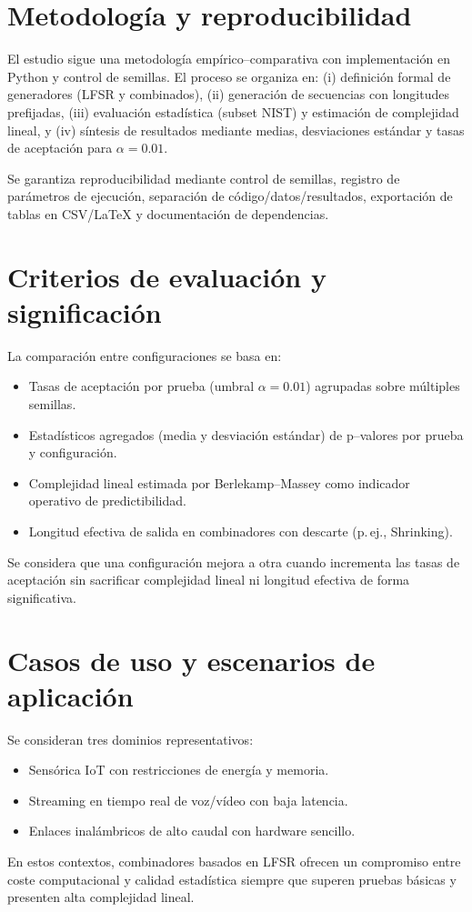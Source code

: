 \section*{Metodología y reproducibilidad}

El estudio sigue una metodología empírico–comparativa con implementación en Python y control de semillas. El proceso se organiza en: (i) definición formal de generadores (LFSR y combinados), (ii) generación de secuencias con longitudes prefijadas, (iii) evaluación estadística (subset NIST) y estimación de complejidad lineal, y (iv) síntesis de resultados mediante medias, desviaciones estándar y tasas de aceptación para $\alpha=0{.}01$.

Se garantiza reproducibilidad mediante control de semillas, registro de parámetros de ejecución, separación de código/datos/resultados, exportación de tablas en CSV/\LaTeX{} y documentación de dependencias.

\section*{Criterios de evaluación y significación}

La comparación entre configuraciones se basa en:
\begin{itemize}
  \item Tasas de aceptación por prueba (umbral $\alpha=0{.}01$) agrupadas sobre múltiples semillas.
  \item Estadísticos agregados (media y desviación estándar) de p--valores por prueba y configuración.
  \item Complejidad lineal estimada por Berlekamp–Massey como indicador operativo de predictibilidad.
  \item Longitud efectiva de salida en combinadores con descarte (p.\,ej., Shrinking).
\end{itemize}
Se considera que una configuración mejora a otra cuando incrementa las tasas de aceptación sin sacrificar complejidad lineal ni longitud efectiva de forma significativa.

\section*{Casos de uso y escenarios de aplicación}

Se consideran tres dominios representativos:
\begin{itemize}
  \item Sensórica IoT con restricciones de energía y memoria.
  \item Streaming en tiempo real de voz/vídeo con baja latencia.
  \item Enlaces inalámbricos de alto caudal con hardware sencillo.
\end{itemize}
En estos contextos, combinadores basados en LFSR ofrecen un compromiso entre coste computacional y calidad estadística siempre que superen pruebas básicas y presenten alta complejidad lineal.

